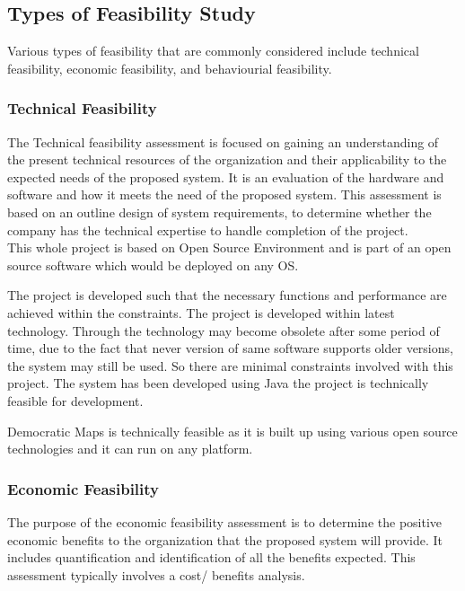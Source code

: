 \subsection{Types of Feasibility Study}
Various types of feasibility that are commonly considered include technical feasibility, economic feasibility, and behaviourial feasibility.

\subsubsection{Technical Feasibility}
The Technical feasibility assessment is focused on gaining an understanding of the present technical resources of the organization and their applicability to the expected needs of the proposed system. It is an evaluation of the hardware and software and how it meets the need of the proposed system. This assessment is based on an outline design of system requirements, to determine whether the company has the technical expertise to handle completion of the project.\\

 This whole project is based on Open
                Source Environment and is part of an open source software which would be deployed on any OS.


The project is developed such that the necessary functions and performance are achieved within the constraints. The project is developed within latest technology. Through the technology may become obsolete after some period of time, due to the fact that never version of same software supports older versions, the system may still be used. So there are minimal constraints involved with this project. The system has been developed using Java the project is technically feasible for development.

Democratic Maps is technically feasible as it is built up using various open source technologies and it can run on any platform.

\subsubsection{Economic Feasibility}
The purpose of the economic feasibility assessment is to determine the positive economic benefits to the organization that the proposed system will provide. It includes quantification and identification of all the benefits expected. This assessment typically involves a cost/ benefits analysis.\\

